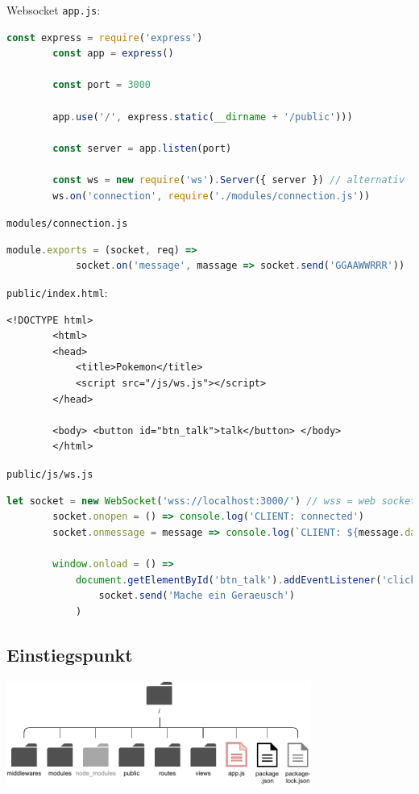 \begin{example}{Websocket}
    \texttt{app.js}:
    \begin{lstlisting}[language=JavaScript]
        const express = require('express')
        const app = express()

        const port = 3000

        app.use('/', express.static(__dirname + '/public')))

        const server = app.listen(port)

        const ws = new require('ws').Server({ server }) // alternativ 'noServer: true'
        ws.on('connection', require('./modules/connection.js'))
    \end{lstlisting}

    \texttt{modules/connection.js}
    \begin{lstlisting}[language=JavaScript]
        module.exports = (socket, req) =>
            socket.on('message', massage => socket.send('GGAAWWRRR'))
    \end{lstlisting}

    \texttt{public/index.html}:
    \begin{lstlisting}[language=HTML5]
        <!DOCTYPE html>
        <html>
        <head>
            <title>Pokemon</title>
            <script src="/js/ws.js"></script>
        </head>

        <body> <button id="btn_talk">talk</button> </body>
        </html>
    \end{lstlisting}

    \texttt{public/js/ws.js}
    \begin{lstlisting}[language=JavaScript]
        let socket = new WebSocket('wss://localhost:3000/') // wss = web socket secure
        socket.onopen = () => console.log('CLIENT: connected')
        socket.onmessage = message => console.log(`CLIENT: ${message.data}`)

        window.onload = () =>
            document.getElementById('btn_talk').addEventListener('click', event =>
                socket.send('Mache ein Geraeusch')
            )
    \end{lstlisting}
\end{example}

\subsection{Einstiegspunkt}

\begin{center}
    \includegraphics[width=0.75\textwidth]{includes/figures/bonus_nodejs_app.pdf}
\end{center}

